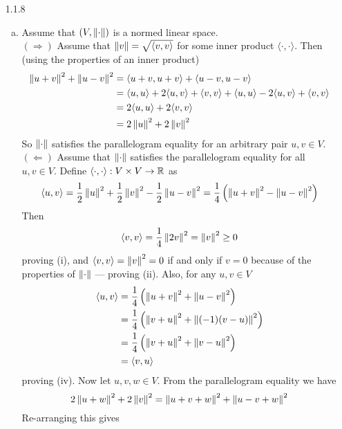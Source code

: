 \documentclass[../../Solutions.tex]{subfiles}
\begin{document}
\begin{itemize}
	\item [1.1.8]
	\begin{enumerate}[(a)]
		\item Assume that $(V,\left\lVert\cdot\right\rVert)$ is a normed linear space. \\
		$(\Rightarrow)$ Assume that $\left\lVert v\right\rVert = \sqrt{\langle v,v \rangle}$ for some inner product $\langle \cdot,\cdot \rangle$.
		Then (using the properties of an inner product)
		\begin{equation*} \begin{split}
			\left\lVert u+v\right\rVert^2+\left\lVert u-v\right\rVert^2 & = \langle u+v , u+v \rangle + \langle u-v,u-v \rangle \\
				& = \langle u,u \rangle + 2\langle u,v \rangle + \langle v,v \rangle + \langle u,u \rangle -2\langle u,v \rangle + \langle v,v \rangle \\
				& = 2\langle u,u \rangle + 2\langle v,v \rangle \\
				& = 2\left\lVert u\right\rVert^2+2\left\lVert v\right\rVert^2
		\end{split} \end{equation*}
		So $\left\lVert\cdot\right\rVert$ satisfies the parallelogram equality for an arbitrary pair $u,v \in V$. \\
		$(\Leftarrow)$ Assume that $\left\lVert\cdot\right\rVert$ satisfies the parallelogram equality for all $u,v \in V$.
		Define $\langle \cdot,\cdot \rangle: V\times V \to \mathbb{R}$ as
		$$ \langle u,v \rangle = \frac{1}{2}\left\lVert u\right\rVert^2+\frac{1}{2}\left\lVert v\right\rVert^2-\frac{1}{2}\left\lVert u-v\right\rVert^2 = \frac{1}{4}\left(\left\lVert u+v\right\rVert^2-\left\lVert u-v\right\rVert^2\right) $$
		Then
		$$ \langle v,v \rangle = \frac{1}{4}\left\lVert2v\right\rVert^2 = \left\lVert v\right\rVert^2 \geq 0 $$
		proving (i), and $\langle v,v \rangle = \left\lVert v\right\rVert^2 = 0$ if and only if $v = 0$ because of the properties of $\left\lVert\cdot\right\rVert$ --- proving (ii).
		Also, for any $u,v \in V$
		\begin{equation*} \begin{split}
			\langle u,v \rangle & = \frac{1}{4}\left(\left\lVert u+v\right\rVert^2+\left\lVert u-v\right\rVert^2\right) \\
				& = \frac{1}{4}\left(\left\lVert v+u\right\rVert^2+\left\lVert(-1)(v-u)\right\rVert^2\right) \\
				& = \frac{1}{4}\left(\left\lVert v+u\right\rVert^2+\left\lVert v-u\right\rVert^2\right) \\
				& = \langle v,u \rangle
		\end{split} \end{equation*}
		proving (iv).
		Now let $u,v,w \in V$.
		From the parallelogram equality we have
		$$ 2\left\lVert u+w\right\rVert^2+2\left\lVert v\right\rVert^2 = \left\lVert u+v+w\right\rVert^2+\left\lVert u-v+w\right\rVert^2 $$
		Re-arranging this gives
		\begin{equation*} \begin{split}

\end{split}
\end{equation*}
\end{enumerate}
\end{itemize}
\end{document}
